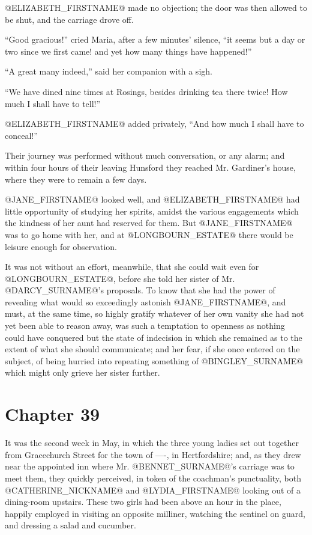 @ELIZABETH_FIRSTNAME@ made no objection; the door was then allowed to be shut, and
the carriage drove off.

``Good gracious!'' cried Maria, after a few minutes' silence, ``it seems
but a day or two since we first came! and yet how many things have
happened!''

``A great many indeed,'' said her companion with a sigh.

``We have dined nine times at Rosings, besides drinking tea there twice!
How much I shall have to tell!''

@ELIZABETH_FIRSTNAME@ added privately, ``And how much I shall have to conceal!''

Their journey was performed without much conversation, or any alarm; and
within four hours of their leaving Hunsford they reached Mr. Gardiner's
house, where they were to remain a few days.

@JANE_FIRSTNAME@ looked well, and @ELIZABETH_FIRSTNAME@ had little opportunity of studying her
spirits, amidst the various engagements which the kindness of her
aunt had reserved for them. But @JANE_FIRSTNAME@ was to go home with her, and at
@LONGBOURN_ESTATE@ there would be leisure enough for observation.

It was not without an effort, meanwhile, that she could wait even for
@LONGBOURN_ESTATE@, before she told her sister of Mr. @DARCY_SURNAME@'s proposals. To know
that she had the power of revealing what would so exceedingly astonish
@JANE_FIRSTNAME@, and must, at the same time, so highly gratify whatever of her own
vanity she had not yet been able to reason away, was such a temptation
to openness as nothing could have conquered but the state of indecision
in which she remained as to the extent of what she should communicate;
and her fear, if she once entered on the subject, of being hurried
into repeating something of @BINGLEY_SURNAME@ which might only grieve her sister
further.



\chapter*{Chapter 39}


It was the second week in May, in which the three young ladies set out
together from Gracechurch Street for the town of ----, in Hertfordshire;
and, as they drew near the appointed inn where Mr. @BENNET_SURNAME@'s carriage
was to meet them, they quickly perceived, in token of the coachman's
punctuality, both @CATHERINE_NICKNAME@ and @LYDIA_FIRSTNAME@ looking out of a dining-room upstairs.
These two girls had been above an hour in the place, happily employed
in visiting an opposite milliner, watching the sentinel on guard, and
dressing a salad and cucumber.

